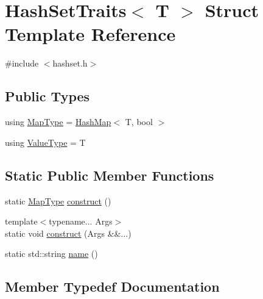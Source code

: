 \hypertarget{structstanfordcpplib_1_1collections_1_1HashSetTraits}{}\section{Hash\+Set\+Traits$<$ T $>$ Struct Template Reference}
\label{structstanfordcpplib_1_1collections_1_1HashSetTraits}


{\ttfamily \#include $<$hashset.\+h$>$}

\subsection*{Public Types}
\begin{DoxyCompactItemize}
\item 
using \mbox{\hyperlink{structstanfordcpplib_1_1collections_1_1HashSetTraits_a6a8a657dc2881db37c98de27231881fa}{Map\+Type}} = \mbox{\hyperlink{classHashMap}{Hash\+Map}}$<$ T, bool $>$
\item 
using \mbox{\hyperlink{structstanfordcpplib_1_1collections_1_1HashSetTraits_aecaeabaa9da616ae42bb20787878260d}{Value\+Type}} = T
\end{DoxyCompactItemize}
\subsection*{Static Public Member Functions}
\begin{DoxyCompactItemize}
\item 
static \mbox{\hyperlink{structstanfordcpplib_1_1collections_1_1HashSetTraits_a6a8a657dc2881db37c98de27231881fa}{Map\+Type}} \mbox{\hyperlink{structstanfordcpplib_1_1collections_1_1HashSetTraits_ac811d1b6f02a0a95b10438adb8c41345}{construct}} ()
\item 
{\footnotesize template$<$typename... Args$>$ }\\static void \mbox{\hyperlink{structstanfordcpplib_1_1collections_1_1HashSetTraits_a7d1c802036cf3e2e07cb1f3b8affea7c}{construct}} (Args \&\&...)
\item 
static std\+::string \mbox{\hyperlink{structstanfordcpplib_1_1collections_1_1HashSetTraits_a7fb46594d295b98500539251135502bc}{name}} ()
\end{DoxyCompactItemize}


\subsection{Member Typedef Documentation}
\mbox{\label{structstanfordcpplib_1_1collections_1_1HashSetTraits_a6a8a657dc2881db37c98de27231881fa}} 
